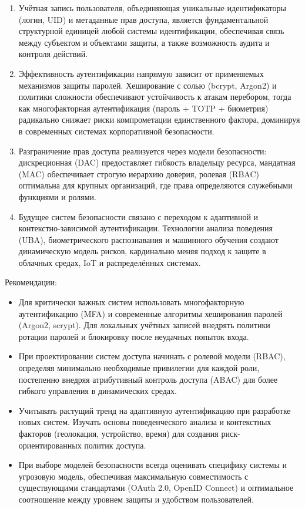 \documentclass{SibFU-docs}
\begin{document}
\begin{enumerate}
    \item Учётная запись пользователя, объединяющая уникальные идентификаторы (логин, UID) и метаданные прав доступа, является фундаментальной структурной единицей любой системы идентификации, обеспечивая связь между субъектом и объектами защиты, а также возможность аудита и контроля действий.
    
    \item Эффективность аутентификации напрямую зависит от применяемых механизмов защиты паролей. Хеширование с солью (bcrypt, Argon2) и политики сложности обеспечивают устойчивость к атакам перебором, тогда как многофакторная аутентификация (пароль + TOTP + биометрия) радикально снижает риски компрометации единственного фактора, доминируя в современных системах корпоративной безопасности.

    \item Разграничение прав доступа реализуется через модели безопасности: дискреционная (DAC) предоставляет гибкость владельцу ресурса, мандатная (MAC) обеспечивает строгую иерархию доверия, ролевая (RBAC) оптимальна для крупных организаций, где права определяются служебными функциями и ролями.

    \item Будущее систем безопасности связано с переходом к адаптивной и контекстно-зависимой аутентификации. Технологии анализа поведения (UBA), биометрического распознавания и машинного обучения создают динамическую модель рисков, кардинально меняя подход к защите в облачных средах, IoT и распределённых системах.

\end{enumerate}

Рекомендации:

\begin{itemize}[label=-]
    \item Для критически важных систем использовать многофакторную аутентификацию (MFA) и современные алгоритмы хеширования паролей (Argon2, scrypt). Для локальных учётных записей внедрять политики ротации паролей и блокировку после неудачных попыток входа.

    \item При проектировании систем доступа начинать с ролевой модели (RBAC), определяя минимально необходимые привилегии для каждой роли, постепенно внедряя атрибутивный контроль доступа (ABAC) для более гибкого управления в динамических средах.

    \item Учитывать растущий тренд на адаптивную аутентификацию при разработке новых систем. Изучать основы поведенческого анализа и контекстных факторов (геолокация, устройство, время) для создания риск-ориентированных политик доступа.

    \item При выборе моделей безопасности всегда оценивать специфику системы и угрозовую модель, обеспечивая максимальную совместимость с существующими стандартами (OAuth 2.0, OpenID Connect) и оптимальное соотношение между уровнем защиты и удобством пользователей.

\end{itemize}
\end{document}
